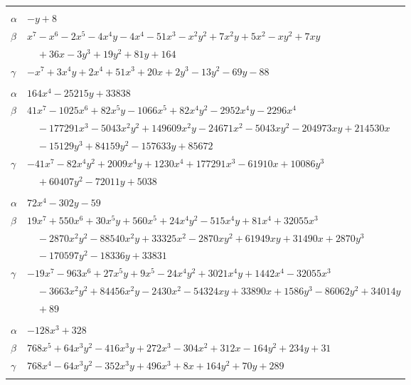 \documentclass[11pt]{article}
\begin{document}
\begin{longtable}{@{}ll@{}}
\addlinespace[3pt]
\multicolumn{2}{@{}l}{$\{i,j\}=\{22,48\}$, $k_{ij}=2^{5}\cdot 3$}\\
$\alpha$ & $-y+8$\\
$\beta$ & $x^{7}-x^{6}-2x^{5}-4x^{4}y-4x^{4}-51x^{3}-x^{2}y^{2}+7x^{2}y+5x^{2}-xy^{2}+7xy$\\
 & $\quad +36x-3y^{3}+19y^{2}+81y+164$\\
$\gamma$ & $-x^{7}+3x^{4}y+2x^{4}+51x^{3}+20x+2y^{3}-13y^{2}-69y-88$\\
\addlinespace[3pt]
\multicolumn{2}{@{}l}{$\{i,j\}=\{22,49\}$, $k_{ij}=2^{7}\cdot 3^{2}\cdot 5^{2}$}\\
$\alpha$ & $164x^{4}-25215y+33838$\\
$\beta$ & $41x^{7}-1025x^{6}+82x^{5}y-1066x^{5}+82x^{4}y^{2}-2952x^{4}y-2296x^{4}$\\
 & $\quad -177291x^{3}-5043x^{2}y^{2}+149609x^{2}y-24671x^{2}-5043xy^{2}-204973xy+214530x$\\
 & $\quad -15129y^{3}+84159y^{2}-157633y+85672$\\
$\gamma$ & $-41x^{7}-82x^{4}y^{2}+2009x^{4}y+1230x^{4}+177291x^{3}-61910x+10086y^{3}$\\
 & $\quad +60407y^{2}-72011y+5038$\\
\addlinespace[3pt]
\multicolumn{2}{@{}l}{$\{i,j\}=\{22,85\}$, $k_{ij}=2\cdot 3\cdot 5$}\\
$\alpha$ & $72x^{4}-302y-59$\\
$\beta$ & $19x^{7}+550x^{6}+30x^{5}y+560x^{5}+24x^{4}y^{2}-515x^{4}y+81x^{4}+32055x^{3}$\\
 & $\quad -2870x^{2}y^{2}-88540x^{2}y+33325x^{2}-2870xy^{2}+61949xy+31490x+2870y^{3}$\\
 & $\quad -170597y^{2}-18336y+33831$\\
$\gamma$ & $-19x^{7}-963x^{6}+27x^{5}y+9x^{5}-24x^{4}y^{2}+3021x^{4}y+1442x^{4}-32055x^{3}$\\
 & $\quad -3663x^{2}y^{2}+84456x^{2}y-2430x^{2}-54324xy+33890x+1586y^{3}-86062y^{2}+34014y$\\
 & $\quad +89$\\
\addlinespace[3pt]
\multicolumn{2}{@{}l}{$\{i,j\}=\{23,31\}$, $k_{ij}=3\cdot 13$}\\
$\alpha$ & $-128x^{3}+328$\\
$\beta$ & $768x^{5}+64x^{3}y^{2}-416x^{3}y+272x^{3}-304x^{2}+312x-164y^{2}+234y+31$\\
$\gamma$ & $768x^{4}-64x^{3}y^{2}-352x^{3}y+496x^{3}+8x+164y^{2}+70y+289$\\
\addlinespace[3pt]

\end{longtable}
\end{document}

